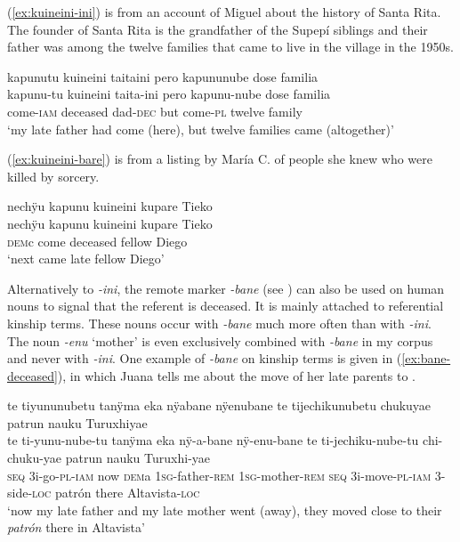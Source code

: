 (\ref{ex:kuineini-ini}) is from an account of Miguel about the history of Santa Rita. The founder of Santa Rita is the grandfather of the Supepí siblings and their father was among the twelve families that came to live in the village in the 1950s.

\ea\label{ex:kuineini-ini}
\begingl 
\glpreamble kapunutu kuineini taitaini pero kapununube dose familia\\
\gla kapunu-tu kuineini taita-ini pero kapunu-nube dose familia\\ 
\glb come-\textsc{iam} deceased dad-\textsc{dec} but come-\textsc{pl} twelve family\\ 
\glft ‘my late father had come (here), but twelve families came (altogether)’
\trailingcitation{[mxx-p110825l.056]}
\xe

(\ref{ex:kuineini-bare}) is from a listing by María C. of people she knew who were killed by sorcery.

\ea\label{ex:kuineini-bare}
\begingl 
\glpreamble nechÿu kapunu kuineini kupare Tieko\\
\gla nechÿu kapunu kuineini kupare Tieko\\ 
\glb \textsc{dem}c come deceased fellow Diego\\ 
\glft ‘next came late fellow Diego’
\trailingcitation{[ump-p110815sf.640]}
\xe

Alternatively to \textit{-ini}, the remote marker \textit{-bane} (see ) can also be used on human nouns to signal that the referent is deceased. It is mainly attached to referential kinship terms. These nouns occur with \textit{-bane} much more often than with \textit{-ini}. The noun \textit{-enu} ‘mother’ is even exclusively combined with \textit{-bane} in my corpus and never with \textit{-ini}. One example of \textit{-bane} on kinship terms is given in (\ref{ex:bane-deceased}), in which Juana tells me about the move of her late parents to .

\ea\label{ex:bane-deceased}
\begingl 
\glpreamble te tiyununubetu tanÿma eka nÿabane nÿenubane te tijechikunubetu chukuyae patrun nauku Turuxhiyae\\
\gla te ti-yunu-nube-tu tanÿma eka nÿ-a-bane nÿ-enu-bane te ti-jechiku-nube-tu chi-chuku-yae patrun nauku Turuxhi-yae\\ 
\glb \textsc{seq} 3i-go-\textsc{pl}-\textsc{iam} now \textsc{dem}a 1\textsc{sg}-father-\textsc{rem} 1\textsc{sg}-mother-\textsc{rem} \textsc{seq} 3i-move-\textsc{pl}-\textsc{iam} 3-side-\textsc{loc} patrón there Altavista-\textsc{loc}\\ 
\glft ‘now my late father and my late mother went (away), they moved close to their \textit{patrón} there in Altavista’
\trailingcitation{[jxx-e150925l-1.248]}
\xe

